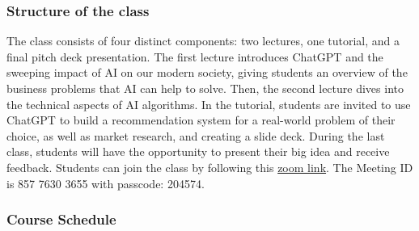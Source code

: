 \documentclass[
]{article}
\begin{document}
\hypertarget{structure-of-the-class}{%
\subsubsection{Structure of the class}\label{structure-of-the-class}}

The class consists of four distinct components: two lectures, one
tutorial, and a final pitch deck presentation. The first lecture
introduces ChatGPT and the sweeping impact of AI on our modern society,
giving students an overview of the business problems that AI can help to
solve. Then, the second lecture dives into the technical aspects of AI
algorithms. In the tutorial, students are invited to use ChatGPT to
build a recommendation system for a real-world problem of their choice,
as well as market research, and creating a slide deck. During the last
class, students will have the opportunity to present their big idea and
receive feedback. Students can join the class by following this
\href{https://us02web.zoom.us/j/85776303655?pwd=d1VrNm1GM3E0ZmpVR3h2VUkwUWMzZz09}{zoom
link}. The Meeting ID is 857 7630 3655 with passcode: 204574.

\hypertarget{course-schedule}{%
\subsubsection{Course Schedule}\label{course-schedule}}
\end{document}

